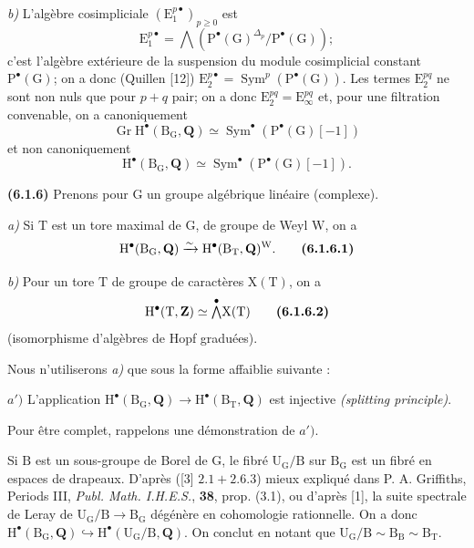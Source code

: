 \documentclass[11pt,leqno]{article}
\begin{document}
\textit{b)} L’algèbre cosimpliciale \((\mathrm{E}_{1}^{p\bullet})_{p\geq 0}\) est
\[
\mathrm{E}_{1}^{p\bullet}
=\mathop{\textstyle\bigwedge}
(\mathrm{P}^{\bullet}(\mathrm{G})^{\Delta_p}/\mathrm{P}^{\bullet}(\mathrm{G}));
\]
c’est l’algèbre extérieure de la suspension du module cosimplicial constant \(\mathrm{P}^{\bullet}(\mathrm{G})\); on a donc (Quillen [12]) \(\mathrm{E}_{2}^{p\bullet}=\operatorname{Sym}^{p}(\mathrm{P}^{\bullet}(\mathrm{G}))\). Les termes \(\mathrm{E}_{2}^{pq}\) ne sont non nuls que pour \(p+q\) pair; on a donc \(\mathrm{E}_{2}^{pq}=\mathrm{E}_{\infty}^{pq}\) et, pour une filtration convenable, on a canoniquement
\[
\operatorname{Gr}\mathrm{H}^{\bullet}(\mathrm{B}_{\mathrm{G}},\mathbf{Q})
\simeq\operatorname{Sym}^{\bullet}(\mathrm{P}^{\bullet}(\mathrm{G})[-1])
\]
et non canoniquement
\[
\mathrm{H}^{\bullet}(\mathrm{B}_{\mathrm{G}},\mathbf{Q})
\simeq\operatorname{Sym}^{\bullet}(\mathrm{P}^{\bullet}(\mathrm{G})[-1]).
\]

\textbf{(6.1.6)} Prenons pour \(\mathrm{G}\) un groupe algébrique linéaire (complexe).

\textit{a)} Si \(\mathrm{T}\) est un tore maximal de \(\mathrm{G}\), de groupe de Weyl \(\mathrm{W}\), on a
\[
\mathrm{H}^{\bullet}(\mathrm{B}_{\mathrm{G}},\mathbf{Q})
\xrightarrow{\sim}
\mathrm{H}^{\bullet}(\mathrm{B}_{\mathrm{T}},\mathbf{Q})^{\mathrm{W}}.
\tag*{\textbf{(6.1.6.1)}}
\]

\textit{b)} Pour un tore \(\mathrm{T}\) de groupe de caractères \(\mathrm{X}(\mathrm{T})\), on a
\[
\mathrm{H}^{\bullet}(\mathrm{T},\mathbf{Z})
\simeq\overset{\bullet}{\mathop{\textstyle\bigwedge}}\mathrm{X}(\mathrm{T})
\tag*{\textbf{(6.1.6.2)}}
\]
(isomorphisme d’algèbres de Hopf graduées).

Nous n’utiliserons \textit{a)} que sous la forme affaiblie suivante :

\(a')\) L’application \(\mathrm{H}^{\bullet}(\mathrm{B}_{\mathrm{G}},\mathbf{Q})\to\mathrm{H}^{\bullet}(\mathrm{B}_{\mathrm{T}},\mathbf{Q})\) est injective \textit{(splitting principle)}.

Pour être complet, rappelons une démonstration de \(a')\).

Si \(\mathrm{B}\) est un sous-groupe de Borel de \(\mathrm{G}\), le fibré \(\mathrm{U}_{\mathrm{G}}/\mathrm{B}\) sur \(\mathrm{B}_{\mathrm{G}}\) est un fibré en espaces de drapeaux. D’après ([3] \(2.1+2.6.3\)) mieux expliqué dans P. A. Griffiths, Periods III, \textit{Publ. Math. I.H.E.S.}, \textbf{38}, prop. (3.1), ou d’après [1], la suite spectrale de Leray de \(\mathrm{U}_{\mathrm{G}}/\mathrm{B}\to\mathrm{B}_{\mathrm{G}}\) dégénère en cohomologie rationnelle. On a donc \(\mathrm{H}^{\bullet}(\mathrm{B}_{\mathrm{G}},\mathbf{Q})\hookrightarrow\mathrm{H}^{\bullet}(\mathrm{U}_{\mathrm{G}}/\mathrm{B},\mathbf{Q})\). On conclut en notant que \(\mathrm{U}_{\mathrm{G}}/\mathrm{B}\sim\mathrm{B}_{\mathrm{B}}\sim\mathrm{B}_{\mathrm{T}}\).
\end{document}
